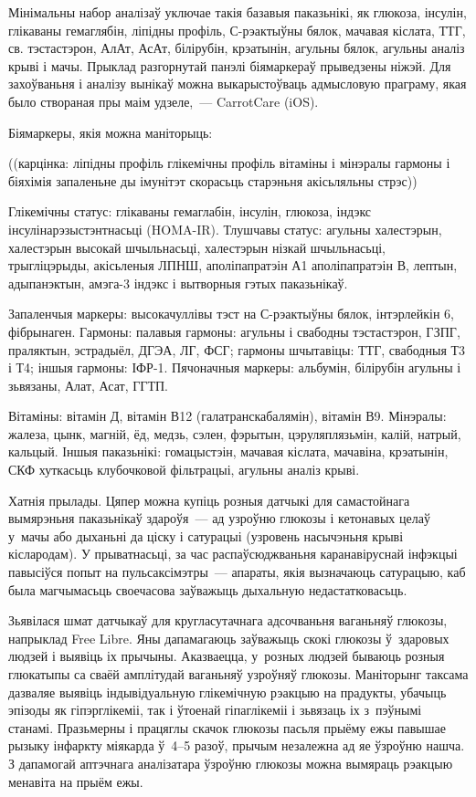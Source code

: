 Мінімальны набор аналізаў уключае такія базавыя паказьнікі, як глюкоза, інсулін, глікаваны гемаглябін, ліпідны профіль, С-рэактыўны бялок, мачавая кіслата, ТТГ, св. тэстастэрон, АлАт, АсАт, білірубін, крэатынін, агульны бялок, агульны аналіз крыві і мачы. Прыклад разгорнутай панэлі біямаркераў прыведзены ніжэй. Для захоўваньня і аналізу вынікаў можна выкарыстоўваць адмысловую праграму, якая было створаная пры маім удзеле,~--- CarrotCare (iOS).

Біямаркеры, якія можна маніторыць:

((карцінка: ліпідны профіль глікемічны профіль вітаміны і мінэралы гармоны і біяхімія запаленьне ды імунітэт скорасьць старэньня акісьляльны стрэс))

Глікемічны статус: глікаваны гемаглабін, інсулін, глюкоза, індэкс інсулінарэзыстэнтнасьці (HOMA-IR). Тлушчавы статус: агульны халестэрын, халестэрын высокай шчыльнасьці, халестэрын нізкай шчыльнасьці, трыгліцэрыды, акісьленыя ЛПНШ, аполіпапратэін А1 аполіпапратэін В, лептын, адыпанэктын, амэга-3 індэкс і вытворныя гэтых паказьнікаў.

Запаленчыя маркеры: высокачуллівы тэст на С-рэактыўны бялок, інтэрлейкін 6, фібрынаген. Гармоны: палавыя гармоны: агульны і свабодны тэстастэрон, ГЗПГ, праляктын, эстрадыёл, ДГЭА, ЛГ, ФСГ; гармоны шчытавіцы: ТТГ, свабодныя Т3 і Т4; іншыя гармоны: ІФР-1. Пячоначныя маркеры: альбумін, білірубін агульны і зьвязаны, Алат, Асат, ГГТП.

Вітаміны: вітамін Д, вітамін В12 (галатранскабалямін), вітамін В9. Мінэралы: жалеза, цынк, магній, ёд, медзь, сэлен, фэрытын, цэруляплязьмін, калій, натрый, кальцый. Іншыя паказьнікі: гомацыстэін, мачавая кіслата, мачавіна, крэатынін, СКФ хуткасьць клубочковой фільтрацыі, агульны аналіз крыві.

Хатнія прылады. Цяпер можна купіць розныя датчыкі для самастойнага вымярэньня паказьнікаў здароўя~--- ад узроўню глюкозы і кетонавых целаў у~мачы або дыханьні да ціску і сатурацыі (узровень насычэньня крыві кіслародам). У прыватнасьці, за час распаўсюджваньня каранавіруснай інфэкцыі павысіўся попыт на пульсаксімэтры~--- апараты, якія вызначаюць сатурацыю, каб была магчымасьць своечасова заўважыць дыхальную недастатковасьць.

Зьявілася шмат датчыкаў для кругласутачнага адсочваньня ваганьняў глюкозы, напрыклад Free Libre. Яны дапамагаюць заўважыць скокі глюкозы ў~здаровых людзей і выявіць іх прычыны. Аказваецца, у~розных людзей бываюць розныя глюкатыпы са сваёй амплітудай ваганьняў узроўняў глюкозы. Маніторынг таксама дазваляе выявіць індывідуальную глікемічную рэакцыю на прадукты, убачыць эпізоды як гіпэрглікеміі, так і ўтоенай гіпаглікеміі і зьвязаць іх з~пэўнымі станамі. Празьмерны і працяглы скачок глюкозы пасьля прыёму ежы павышае рызыку інфаркту міякарда ў~4--5 разоў, прычым незалежна ад яе ўзроўню нашча. З дапамогай аптэчнага аналізатара ўзроўню глюкозы можна вымяраць рэакцыю менавіта на прыём ежы.

